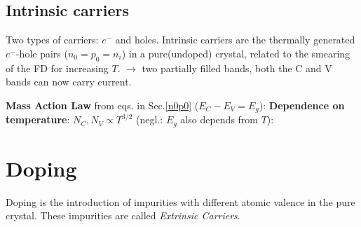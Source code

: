 \documentclass[a4paper, fontsize=8pt, landscape, DIV=1]{scrartcl}
\begin{document}
\begin{multicols*}{4}
\subsection{Intrinsic carriers}
Two types of carriers: $e^-$ and holes. Intrinsic carriers are the thermally generated $e^-$-hole pairs ($n_0=p_0=n_i$) in a pure(undoped) crystal, related to the smearing of the FD for increasing $T$. $\rightarrow$ two partially filled bands, both the C and V bands can now carry current.

\textbf{Mass Action Law} from eqs. in Sec.\ref{n0p0} ($E_C-E_V=E_g$):
\textbf{Dependence on temperature}: $N_C,N_V \propto T^{3/2}$ (negl.: $E_g$ also depends from $T$):


  \section{Doping}
  Doping is the introduction of impurities with different atomic valence in the pure crystal. These impurities are called \textit{Extrinsic Carriers}.



\end{multicols*}
\end{document}
